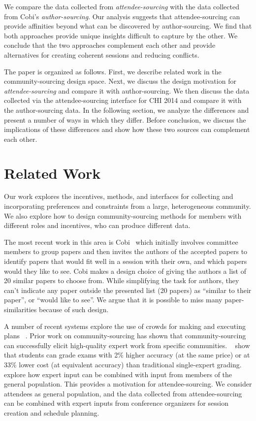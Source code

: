 \documentclass[letterpaper]{article}
\begin{document}
We compare the data collected from \emph{attendee-sourcing} with the data collected from Cobi's \emph{author-sourcing}. Our analysis suggests that attendee-sourcing can provide affinities beyond what can be discovered by author-sourcing. We find that both approaches provide unique insights difficult to capture by the other. We conclude that the two approaches complement each other and provide alternatives for creating coherent sessions and reducing conflicts.

The paper is organized as follows. First, we describe related work in the community-sourcing design space. Next, we discuss the design motivation for \emph{attendee-sourcing} and compare it with author-sourcing. We then discuss the data collected via the attendee-sourcing interface for CHI 2014 and compare it with the author-sourcing data. In the following section, we analyze the differences and present a number of ways in which they differ. Before conclusion, we discuss the implications of these differences and show how these two sources can complement each other.

\section{Related Work}
Our work explores the incentives, methods, and interfaces for collecting and incorporating preferences and constraints from a large, heterogeneous community. We also explore how to design community-sourcing methods for members with different roles and incentives, who can produce different data.

The most recent work in this area is Cobi~\cite{CobiUIST2013} which initially involves committee members to group papers and then invites the authors of the accepted papers to identify papers that would fit well in a session with their own, and which papers would they like to see. Cobi makes a design choice of giving the authors a list of 20 similar papers to choose from. While simplifying the task for authors, they can't indicate any paper outside the presented list (20 papers) as ``similar to their paper'', or ``would like to see''. We argue that it is possible to miss many paper-similarities because of such design.

A number of recent systems explore the use of crowds for making and executing plans ~\cite{CollaborativePlanning, Turkomatic, HCT, EmailVallet}. Prior work on community-sourcing has shown that community-sourcing can successfully elicit high-quality expert work from specific communities. ~\cite{CommunitySourcing} show that students can grade exams with 2\% higher accuracy (at the same price) or at 33\% lower cost (at equivalent accuracy) than traditional single-expert grading. ~\cite{CrowdDiversity} explore how expert input can be combined with input from members of the general population. This provides a motivation for attendee-sourcing. We consider attendees as general population, and the data collected from attendee-sourcing can be combined with expert inputs from conference organizers for session creation and schedule planning.
\end{document}
